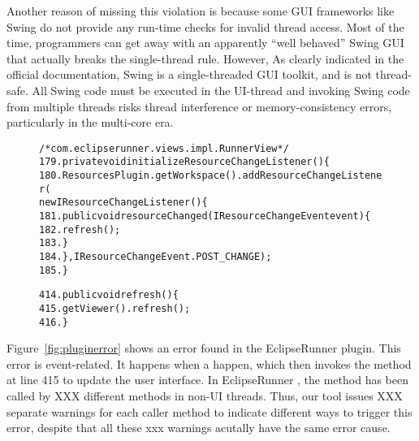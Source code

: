 Another reason of missing this violation is because some GUI frameworks like Swing
do not provide any run-time checks for invalid thread access. Most
of the time, programmers can get away with an apparently ``well behaved'' Swing
GUI that actually breaks the single-thread rule. However, As clearly
indicated in the official documentation, Swing is a single-threaded GUI
toolkit, and is not thread-safe. All Swing code must be executed in the UI-thread and
invoking Swing code from multiple threads risks thread interference
or memory-consistency errors, particularly in the multi-core era.



\begin{figure}[t]
\begin{CodeOut}
\begin{alltt} 
/* com.eclipserunner.views.impl.RunnerView */
179.private void initializeResourceChangeListener() \{
180.  ResourcesPlugin.getWorkspace().addResourceChangeListener(
        new IResourceChangeListener() \{
181.      public void resourceChanged(IResourceChangeEvent event) \{
182.        refresh();
183.      \}
184.  \}, IResourceChangeEvent.POST\_CHANGE);
185.\}

414.public void refresh() \{
415.  getViewer().refresh();
416.\}
\end{alltt}
\end{CodeOut}
\vspace*{-2.0ex}  %
\end{figure}

Figure~\ref{fig:pluginerror} shows an error found in the EclipseRunner
plugin. This error is event-related. It happens when a 
 happen, which then invokes the 
method at line 415 to update the user interface. In EclipseRunner
, the  method has been
called by XXX different methods in non-UI threads. Thus, our
tool issues XXX separate warnings for each caller method to indicate
different ways to trigger this error, despite that all these xxx warnings
acutally have the same error cause.

